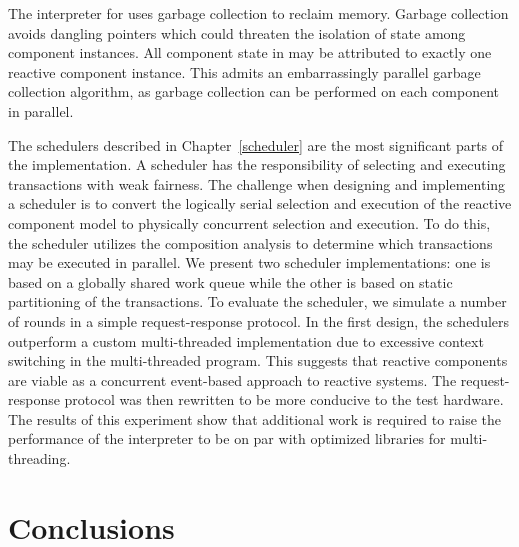 The interpreter for \rcgo{} uses garbage collection to reclaim memory.
Garbage collection avoids dangling pointers which could threaten the isolation of state among component instances.
All component state in \rcgo{} may be attributed to exactly one reactive component instance.
This admits an embarrassingly parallel garbage collection algorithm, as garbage collection can be performed on each component in parallel.

The schedulers described in Chapter~\ref{scheduler} are the most significant parts of the \rcgo{} implementation.
A scheduler has the responsibility of selecting and executing transactions with weak fairness.
The challenge when designing and implementing a scheduler is to convert the logically serial selection and execution of the reactive component model to physically concurrent selection and execution.
To do this, the scheduler utilizes the composition analysis to determine which transactions may be executed in parallel.
We present two scheduler implementations:  one is based on a globally shared work queue while the other is based on static partitioning of the transactions.
To evaluate the scheduler, we simulate a number of rounds in a simple request-response protocol.
In the first design, the \rcgo{} schedulers outperform a custom multi-threaded implementation due to excessive context switching in the multi-threaded program.
This suggests that reactive components are viable as a concurrent event-based approach to reactive systems.
The request-response protocol was then rewritten to be more conducive to the test hardware.
The results of this experiment show that additional work is required to raise the performance of the \rcgo{} interpreter to be on par with optimized libraries for multi-threading.

\section{Conclusions}

